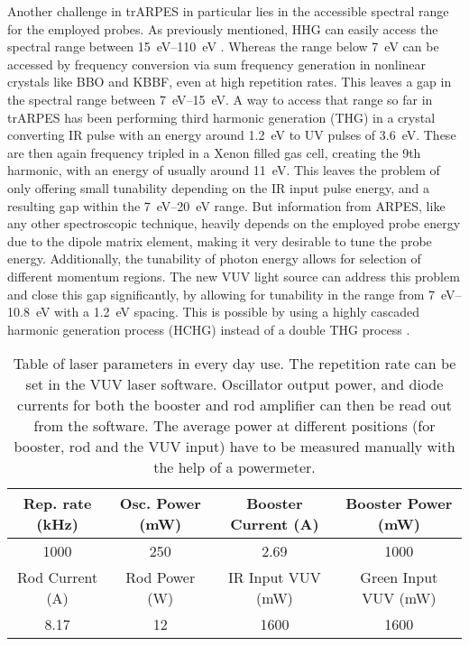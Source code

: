 Another challenge in trARPES in particular lies in the accessible spectral range for the employed probes.
As previously mentioned, HHG can easily access the spectral range between \qtyrange{15}{110}{\electronvolt} \cite{chini_coherent_2014,weissenbilder_how_2022}.
Whereas the range below \qty{7}{\electronvolt} can be accessed by frequency conversion via sum frequency generation in nonlinear crystals like BBO and KBBF, even at high repetition rates.
This leaves a gap in the spectral range between \qtyrange{7}{15}{\electronvolt}.
A way to access that range so far in trARPES has been performing third harmonic generation (THG) in a crystal converting IR pulse with an energy around \qty{1.2}{\electronvolt} to UV pulses of \qty{3.6}{\electronvolt}.
These are then again frequency tripled in a Xenon filled gas cell, creating the 9th harmonic, with an energy of usually around \qty{11}{\electronvolt}.
This leaves the problem of only offering small tunability depending on the IR input pulse energy, and a resulting gap within the \qtyrange{7}{20}{\electronvolt} range.
But information from ARPES, like any other spectroscopic technique, heavily depends on the employed probe energy due to the dipole matrix element, making it very desirable to tune the probe energy.
Additionally, the tunability of photon energy allows for selection of different momentum regions. 
The new VUV light source can address this problem and close this gap significantly, by allowing for tunability in the range from \qtyrange{7}{10.8}{\electronvolt} with a \qty{1.2}{\electronvolt} spacing.
This is possible by using a highly cascaded harmonic generation process (HCHG) instead of a double THG process \cite{couch_ultrafast_2020}.

\begin{table}[t]
	\centering
	\begin{tabular}{ *{4}{c} }
		\hline
		Rep. rate (\unit{\kilo\hertz})		& Osc. Power (\unit{\milli\watt}) 	& Booster Current (\unit{\ampere}) 		 & Booster Power (\unit{\milli\watt})	\\ \hline\hline
		1000								& 250							  	& 2.69								  	 & 1000									\\ \hline
		Rod Current (\unit{\ampere}) 		& Rod Power (\unit{\watt})			& IR Input VUV (\unit{\milli\watt})		 & Green Input VUV (\unit{\milli\watt})	\\ \hline\hline
		8.17								& 12					  			& 1600								   	 & 1600									\\ \hline
	\end{tabular}
	\caption{Table of laser parameters in every day use. The repetition rate can be set in the VUV laser software. Oscillator output power, and diode currents for both the booster and rod amplifier can then be read out from the software. The average power at different positions (for booster, rod and the VUV input) have to be measured manually with the help of a powermeter.}
	\label{tab:laser_param}
\end{table}

